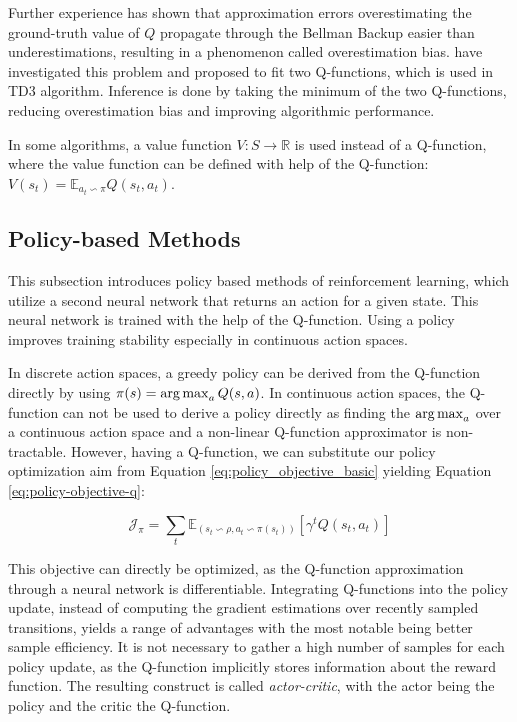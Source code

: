 Further experience has shown that approximation errors overestimating the ground-truth value of $Q$ propagate through the Bellman Backup easier than underestimations, resulting in a phenomenon called overestimation bias. \citet{hasseltDoubleQlearning2010} have investigated this problem and proposed to fit two Q-functions, which is used in  \ac{TD3} algorithm. Inference is done by taking the minimum of the two Q-functions, reducing overestimation bias and improving algorithmic performance. 

In some algorithms, a value function $V : S \rightarrow \mathbb{R}$ is used instead of a Q-function, where the value function can be defined with help of the Q-function: $V(s_t) = \mathbb{E}_{a_t \backsim \pi} Q(s_t, a_t)$.

\subsection{Policy-based Methods}

\begin{summary}
This subsection introduces policy based methods of reinforcement learning, which utilize a second neural network that returns an action for a given state. This neural network is trained with the help of the Q-function. Using a policy improves training stability especially in continuous action spaces.
\end{summary}

In discrete action spaces, a greedy policy can be derived from the Q-function directly by using $\pi(s) = \operatorname*{arg\,max}_a Q(s,a)$. In continuous action spaces, the Q-function can not be used to derive a policy directly as finding the $\operatorname*{arg\,max}_a$ over a continuous action space and a non-linear Q-function approximator is non-tractable. However, having a Q-function, we can substitute our policy optimization aim from Equation \ref{eq:policy_objective_basic} yielding Equation \ref{eq:policy-objective-q}:

\begin{equation}
  \mathcal{J}_{\pi} = \sum_t \mathbb{E}_{(s_t \backsim \rho, a_t \backsim \pi(s_t))} [\gamma^t Q(s_t, a_t)]
  \label{eq:policy-objective-q}
\end{equation}

This objective can directly be optimized, as the Q-function approximation through a neural network is differentiable. Integrating Q-functions into the policy update, instead of computing the gradient estimations over recently sampled transitions, yields a range of advantages with the most notable being better sample efficiency. It is not necessary to gather a high number of samples for each policy update, as the Q-function implicitly stores information about the reward function. The resulting construct is called \textit{actor-critic}, with the actor being the policy and the critic the Q-function. 

